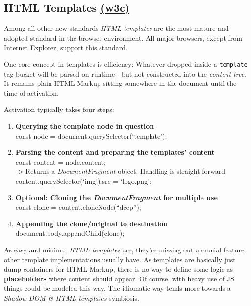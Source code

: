 \documentclass[]{assets/latex/ieee}
\providecommand{\tightlist}{%
  \setlength{\itemsep}{0pt}\setlength{\parskip}{0pt}}
\begin{document}
\subsection{\texorpdfstring{HTML Templates
\href{https://www.w3.org/TR/html5/scripting-1.html\#the-template-element}{(w3c)}}{HTML Templates (w3c)}}\label{html-templates-w3c}

Among all other new standards \emph{HTML templates} are the most mature
and adopted standard in the browser environment. All major browsers,
except from Internet Explorer, support this standard.

One core concept in templates is efficiency: Whatever dropped inside a
\texttt{template} tag \sout{bucket} will be parsed on runtime - but not
constructed into the \emph{content tree}. It remains plain HTML Markup
sitting somewhere in the document until the time of activation.

Activation typically takes four steps:

\begin{enumerate}
\def\labelenumi{\arabic{enumi}.}
\tightlist
\item
  \textbf{Querying the template node in question}\\
  const node = document.querySelector(`template');
\item
  \textbf{Parsing the content and preparing the templates' content}\\
  const content = node.content;\\
  -\textgreater{} Returns a \emph{DocumentFragment} object. Handling is
  straight forward content.querySelector(`img').src = `logo.png';
\item
  \textbf{Optional: Cloning the \emph{DocumentFragment} for multiple
  use}\\
  const clone = content.cloneNode(``deep'');
\item
  \textbf{Appending the clone/original to destination}\\
  document.body.appendChild(clone);
\end{enumerate}

As easy and minimal \emph{HTML templates} are, they're missing out a
crucial feature other template implementations usually have. As
templates are basically just dump containers for HTML Markup, there is
no way to define some logic as \textbf{placeholders} where content
should appear. Of course, with heavy use of JS things could be modeled
this way. The idiomatic way tends more towards a \emph{Shadow DOM \&
HTML templates} symbiosis.
\end{document}
